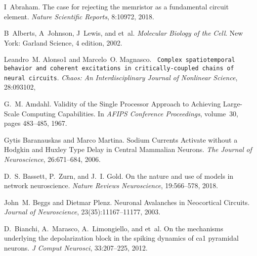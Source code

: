 
\begin{DoxyDescription}
\item[\label{citelist_CITEREF_RejectingMemristor:2018}%
\mbox{[}1\mbox{]}]I~Abraham. The case for rejecting the memristor as a fundamental circuit element. {\itshape Nature Scientific Reports}, 8\+:10972, 2018. 


\item[\label{citelist_CITEREF_MolecularBiology:2002}%
\mbox{[}2\mbox{]}]B~Alberts, A~Johnson, J~Lewis, and et~al. {\itshape Molecular Biology of the Cell}. New York\+: Garland Science, 4 edition, 2002.


\item[\label{citelist_CITEREF_CoherentSpatioTemporal:2018}%
\mbox{[}3\mbox{]}]Leandro~M. Alonso1 and Marcelo~O. Magnasco. {\texttt{ Complex spatiotemporal behavior and coherent excitations in critically-\/coupled chains of neural circuits}}. {\itshape Chaos\+: An Interdisciplinary Journal of Nonlinear Science}, 28\+:093102,
\begin{DoxyEnumerate}
\item 
\end{DoxyEnumerate}


\item[\label{citelist_CITEREF_AmdahlSingleProcessor67}%
\mbox{[}4\mbox{]}]G.~M. Amdahl. Validity of the Single Processor Approach to Achieving Large-\/\+Scale Computing Capabilities. In {\itshape AFIPS Conference Proceedings}, volume~30, pages 483--485, 1967. 


\item[\label{citelist_CITEREF_SodiumCurrentDelay:2006}%
\mbox{[}5\mbox{]}]Gytis Baranauskas and Marco Martina. Sodium Currents Activate without a Hodgkin and Huxley Type Delay in Central Mammalian Neurons. {\itshape The Journal of Neuroscience}, 26\+:671--684, 2006.


\item[\label{citelist_CITEREF_BrainNetworkModels:2018}%
\mbox{[}6\mbox{]}]D.~S. Bassett, P.~Zurn, and J.~I. Gold. On the nature and use of models in network neuroscience. {\itshape Nature Reviews Neuroscience}, 19\+:566--578, 2018. 


\item[\label{citelist_CITEREF_NeuronalAvalanches:2003}%
\mbox{[}7\mbox{]}]John~M. Beggs and Dietmar Plenz. Neuronal Avalanches in Neocortical Circuits. {\itshape Journal of Neuroscience}, 23(35)\+:11167--11177, 2003. 


\item[\label{citelist_CITEREF_DepolarizationBianchi:2012}%
\mbox{[}8\mbox{]}]D.~Bianchi, A.~Marasco, A.~Limongiello, and et~al. On the mechanisms underlying the depolarization block in the spiking dynamics of ca1 pyramidal neurons. {\itshape J Comput Neurosci}, 33\+:207–225, 2012. 



\end{DoxyDescription}

